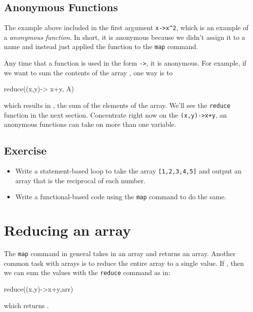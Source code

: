 \subsection{Anonymous Functions}

The example above included in the first argument \verb!x->x^2!, which is an example of a \emph{anonymous function}.  In short, it is anonymous because we didn't assign it to a name and instead just applied the function to the \verb|map| command.  

Any time that a function is used in the form \verb!->!, it is anonymous.  For example, if we want to sum the contents of the array , one way is to 
\begin{jlblock}[fp]
reduce((x,y)-> x+y, A)
\end{jlblock}
which results in  \printpythontex[verb], the sum of the elements of the array.  We'll see the \verb!reduce! function in the next section.  Concentrate right now on the \verb!(x,y)->x+y!, an anonymous functions can take on more than one variable.  


\subsection{Exercise}

\begin{itemize}
\item Write a statement-based loop to take the array \texttt{{[}1,2,3,4,5{]}} and output an array that is the reciprocal of each number.
\item Write a functional-based code using the \texttt{map} command to do the same.
\end{itemize}

\section{Reducing an array}\label{sect:reduce:array}

The \texttt{map} command in general takes in an array and returns an array. Another common task with arrays is to  reduce the entire array to a single value. If , then we can sum the values with the \texttt{reduce} command as in:
%
\begin{jlblock}[fp]
reduce((x,y)->x+y,arr)
\end{jlblock}
%
which returns \printpythontex[verb]. 


